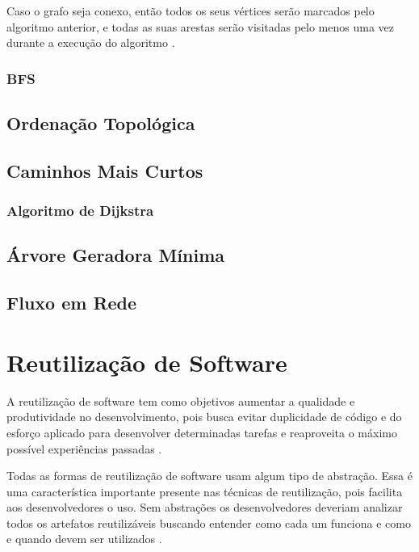 Caso o grafo seja conexo, então todos os seus vértices serão marcados pelo algoritmo anterior, e todas as suas
arestas serão visitadas pelo menos uma vez durante a execução do algoritmo \cite{Manber:1989}.

\subsubsection{BFS}

\subsection{Ordenação Topológica}

\subsection{Caminhos Mais Curtos}

\subsubsection{Algoritmo de Dijkstra}

\subsection{Árvore Geradora Mínima}

\subsection{Fluxo em Rede}

\section{Reutilização de Software}

A reutilização de software tem como objetivos aumentar a qualidade e produtividade no desenvolvimento, pois busca evitar duplicidade de código e do esforço aplicado para desenvolver determinadas tarefas e reaproveita o máximo possível experiências passadas \cite{Lucredio:2009}.

Todas as formas de reutilização de software usam algum tipo de abstração.  Essa é uma característica importante presente nas técnicas de reutilização, pois facilita aos desenvolvedores o uso. Sem abstrações os desenvolvedores deveriam analizar todos os artefatos reutilizáveis buscando entender como cada um funciona e como e quando devem ser utilizados \cite{Krueger:1992}.

